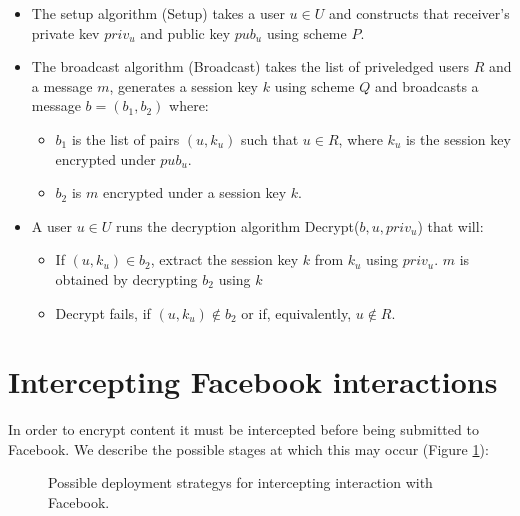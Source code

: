     \begin{itemize}
    
    \item The setup algorithm {\sc (Setup)} takes a user $u \in U$ and constructs that receiver's private kev $priv_u$ and public key $pub_u$ using scheme $P$.
    
    \item The broadcast algorithm {\sc (Broadcast)} takes the list of priveledged users $R$ and a message $m$, generates a session key $k$ using scheme $Q$ and broadcasts a message $b = (b_1,b_2)$ where:
    
    \begin{itemize}
        \item $b_1$ is the list of pairs $(u,k_u)$ such that $u \in R$, where $k_u$ is the session key encrypted under $pub_u$.
        \item $b_2$ is $m$ encrypted under a session key $k$.
    \end{itemize}
    
    
    \item A user $u \in U$ runs the decryption algorithm {\sc Decrypt($b, u, priv_u$)} that will:
    
        \begin{itemize}
            \item If $(u,k_u) \in b_2$, extract the session key $k$ from $k_u$ using $priv_u$. $m$ is obtained by decrypting $b_2$ using $k$
        
            \item {\sc Decrypt} fails, if $(u,k_u) \notin b_2$ or if, equivalently, $u \notin R$.
        
        \end{itemize}

    \end{itemize}
    
    

\FloatBarrier
\section{Intercepting Facebook interactions}

In order to encrypt content it must be intercepted before being submitted to Facebook. We describe the possible stages at which this may occur (Figure \ref{fig:approaches}):

\begin{figure}[tb]
\begin{center}
    
\caption{Possible deployment strategys for intercepting interaction with Facebook.}
\label{fig:approaches}
\end{center}
\end{figure}

